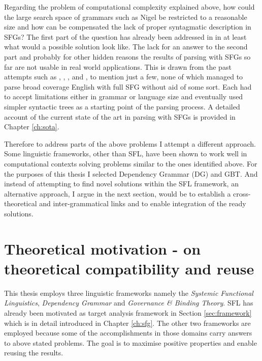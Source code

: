 Regarding the problem of computational complexity explained above, how could the large search space of grammars such as Nigel be restricted to a reasonable size and how can be compensated the lack of proper syntagmatic description in SFGs? The first part of the question has already been addressed in \citet{ODonnell1993} in at least what would a possible solution look like. The lack for an answer to the second part and probably for other hidden reasons the results of parsing with SFGs so far are not usable in real world applications. This is drawn from the past attempts such as \citet{Kasper1988}, \citet{Kay1985}, \citet{ODonoghue1991a}, \citet{ODonnell1993} and \citet{Day2007}, to mention just a few, none of which managed to parse broad coverage English with full SFG without aid of some sort. Each had to accept limitations either in grammar or language size and eventually used simpler syntactic trees as a starting point of the parsing process. A detailed account of the current state of the art in parsing with SFGs is provided in Chapter \ref{ch:sota}. 

Therefore to address parts of the above problems I attempt a different approach. %
Some linguistic frameworks, other than SFL, have been shown to work well in computational contexts solving problems similar to the ones identified above. For the purposes of this thesis I selected Dependency Grammar (DG) and GBT. And instead of attempting to find novel solutions within the SFL framework, an alternative approach, I argue in the next section, would be to establish a cross-theoretical and inter-grammatical links and to enable integration of the ready solutions. 

\section{Theoretical motivation - on theoretical compatibility and reuse}
\label{sec:reuse}

This thesis employs three linguistic frameworks namely the \textit{Systemic Functional Linguistics}, \textit{Dependency Grammar} and \textit{Governance \& Binding Theory}. SFL has already been motivated as target analysis framework in Section \ref{sec:framework} which is in detail introduced in Chapter \ref{ch:sfg}. The other two frameworks are employed because some of the accomplishments in those domains carry answers to above stated problems. The goal is to maximise positive properties and enable reusing the results. 

